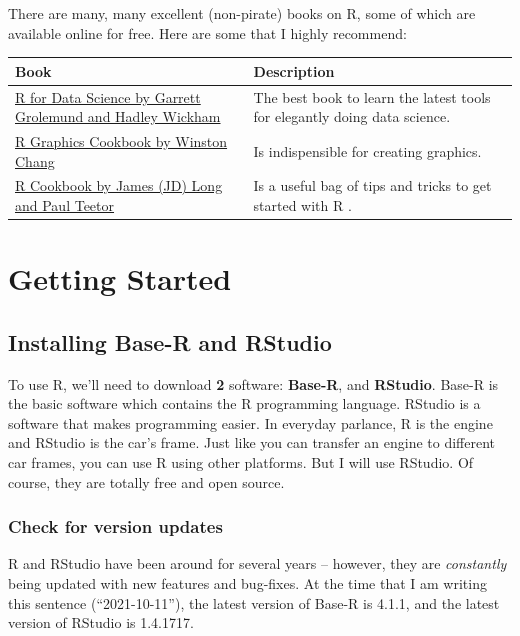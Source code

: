 \documentclass[
]{book}
\begin{document}
There are many, many excellent (non-pirate) books on R, some of which are available online for free. Here are some that I highly recommend:

\begin{longtable}[]{@{}
  >{\raggedright\arraybackslash}p{}
  >{\raggedright\arraybackslash}p{}@{}}
\toprule
Book & Description \\
\midrule
\endhead
\href{http://r4ds.had.co.nz/}{R for Data Science by Garrett Grolemund and Hadley Wickham} & The best book to learn the latest tools for elegantly doing data science. \\
\href{http://www.cookbook-r.com/Graphs/}{R Graphics Cookbook by Winston Chang} & Is indispensible for creating graphics. \\
\href{https://rc2e.com/index.html}{R Cookbook by James (JD) Long and Paul Teetor} & Is a useful bag of tips and tricks to get started with R . \\
\bottomrule
\end{longtable}

\hypertarget{get-started}{%
\chapter{Getting Started}\label{get-started}}

\hypertarget{INSTALL-GET-STARTED}{%
\section{Installing Base-R and RStudio}\label{INSTALL-GET-STARTED}}

To use R, we'll need to download \textbf{2} software: \textbf{Base-R}, and \textbf{RStudio}. Base-R is the basic software which contains the R programming language. RStudio is a software that makes programming easier. In everyday parlance, R is the engine and RStudio is the car's frame. Just like you can transfer an engine to different car frames, you can use R using other platforms. But I will use RStudio. Of course, they are totally free and open source.

\hypertarget{check-for-version-updates}{%
\subsection{Check for version updates}\label{check-for-version-updates}}

R and RStudio have been around for several years -- however, they are \emph{constantly} being updated with new features and bug-fixes. At the time that I am writing this sentence (``2021-10-11''), the latest version of Base-R is 4.1.1, and the latest version of RStudio is 1.4.1717.
\end{document}
